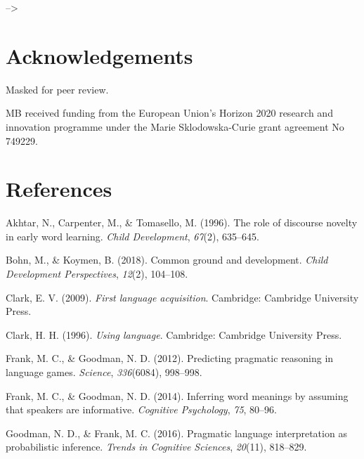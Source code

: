 \documentclass[10pt, letterpaper]{article}
\begin{document}
\vspace{1em}
\vspace{1em} --\textgreater{}

\section{Acknowledgements}\label{acknowledgements}

Masked for peer review.

MB received funding from the European Union's Horizon 2020 research and
innovation programme under the Marie Sklodowska-Curie grant agreement No
749229.

\section{References}\label{references}

\setlength{\parindent}{-0.1in} \setlength{\leftskip}{0.125in} \noindent

\hypertarget{refs}{}
\hypertarget{ref-akhtar1996role}{}
Akhtar, N., Carpenter, M., \& Tomasello, M. (1996). The role of
discourse novelty in early word learning. \emph{Child Development},
\emph{67}(2), 635--645.

\hypertarget{ref-bohn2018common}{}
Bohn, M., \& Koymen, B. (2018). Common ground and development.
\emph{Child Development Perspectives}, \emph{12}(2), 104--108.

\hypertarget{ref-clark2009first}{}
Clark, E. V. (2009). \emph{First language acquisition}. Cambridge:
Cambridge University Press.

\hypertarget{ref-clark1996using}{}
Clark, H. H. (1996). \emph{Using language}. Cambridge: Cambridge
University Press.

\hypertarget{ref-frank2012predicting}{}
Frank, M. C., \& Goodman, N. D. (2012). Predicting pragmatic reasoning
in language games. \emph{Science}, \emph{336}(6084), 998--998.

\hypertarget{ref-frank2014inferring}{}
Frank, M. C., \& Goodman, N. D. (2014). Inferring word meanings by
assuming that speakers are informative. \emph{Cognitive Psychology},
\emph{75}, 80--96.

\hypertarget{ref-goodman2016pragmatic}{}
Goodman, N. D., \& Frank, M. C. (2016). Pragmatic language
interpretation as probabilistic inference. \emph{Trends in Cognitive
Sciences}, \emph{20}(11), 818--829.
\end{document}
